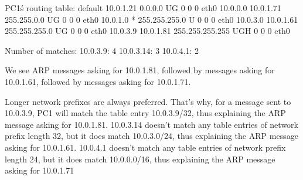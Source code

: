PC1\'s routing table:
default         10.0.1.21       0.0.0.0         UG        0 0          0 eth0
10.0.0.0        10.0.1.71       255.255.0.0     UG        0 0          0 eth0
10.0.1.0        *               255.255.255.0   U         0 0          0 eth0
10.0.3.0        10.0.1.61       255.255.255.0   UG        0 0          0 eth0
10.0.3.9        10.0.1.81       255.255.255.255 UGH       0 0          0 eth0

Number of matches:
10.0.3.9: 4
10.0.3.14: 3
10.0.4.1: 2

We see ARP messages asking for 10.0.1.81, followed by messages asking for 10.0.1.61, followed by messages asking for 10.0.1.71.

Longer network prefixes are always preferred. That's why, for a message sent to 10.0.3.9, PC1 will match the table entry 10.0.3.9/32, thus explaining the ARP message asking for 10.0.1.81.
10.0.3.14 doesn't match any table entries of network prefix length 32, but it does match 10.0.3.0/24, thus explaining the ARP message asking for 10.0.1.61.
10.0.4.1 doesn't match any table entries of network prefix length 24, but it does match 10.0.0.0/16, thus explaining the ARP message asking for 10.0.1.71